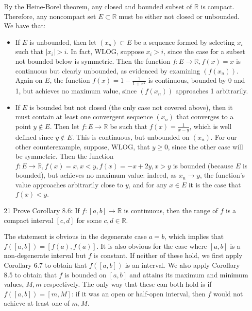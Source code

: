 \begin{solution}
    
    By the Heine-Borel theorem, any closed and bounded subset of $\mathbb{R}$ is compact.
    Therefore, any noncompact set $E \subset \mathbb{R}$ must be either not closed or unbounded.
    We have that:
    \begin{itemize}
        \item If $E$ is unbounded, then let $(x_n) \subset E$ be a sequence formed by selecting $x_i$ such that $\lvert x_i \rvert > i$.
        In fact, WLOG, suppose $x_i > i$, since the case for a subset not bounded below is symmetric.
        Then the function $f: E \rightarrow \mathbb{R}, f(x) = x$ is continuous but clearly unbounded, as evidenced by examining $(f(x_n))$.
        Again on $E$, the function $f(x) = 1 - \frac{1}{1 + x^2}$ is continuous, bounded by 0 and 1, but achieves no maximum value, since $(f(x_n))$ approaches 1 arbitrarily.
        \item If $E$ is bounded but not closed (the only case not covered above), then it must contain at least one convergent sequence $(x_n)$ that converges to a point $y \notin E$.
        Then let $f: E \rightarrow \mathbb{R}$ be such that $f(x) = \frac{1}{x - y}$, which is well defined since $y \notin E$.
        This is continuous, but unbounded on $(x_n)$.
        For our other counterexample, suppose, WLOG, that $y \geq 0$, since the other case will be symmetric.
        Then the function $f: E \rightarrow \mathbb{R}, f(x) = x, x < y, f(x) = - x + 2y, x > y$ is bounded (because $E$ is bounded), but achieves no maximum value: indeed, as $x_n \rightarrow y$, the function's value approaches arbitrarily close to $y$, and for any $x \in E$ it is the case that $f(x) < y$.
        
    \end{itemize} 
\end{solution}

\begin{exercise}{21}
    Prove Corollary 8.6: If $f: [a, b] \rightarrow \mathbb{R}$ is continuous, then the range of $f$ is a compact interval $[c, d]$ for some $c, d \in \mathbb{R}$.
\end{exercise}

\begin{solution}
    
    The statement is obvious in the degenerate case $a = b$, which implies that $f([a, b]) = [f(a), f(a)]$.
    It is also obvious for the case where $[a, b]$ is a non-degenerate interval but $f$ is constant.
    If neither of these hold, we first apply Corollary 6.7 to obtain that $f([a, b])$ is an interval.
    We also apply Corollary 8.5 to obtain that $f$ is bounded on $[a, b]$ and attains its maximum and minimum values, $M, m$ respectively.
    The only way that these can both hold is if $f([a, b]) = [m, M]$: if it was an open or half-open interval, then $f$ would not achieve at least one of $m, M$.
\end{solution}


